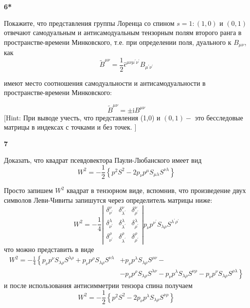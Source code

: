 \documentclass[a4paper,12pt]{article} %
\begin{document}
\begin{task}\textbf{6*}

Покажите, что представления группы Лоренца со спином $s = 1:
(1, 0)$ и $(0, 1)$ отвечают самодуальным и антисамодуальным 
тензорным полям второго ранга в пространстве-времени Минковского, т.е. при
определении поля, дуального к $ B_{\mu\nu}$, как
$$
\tilde{B}^{\mu \nu}=\frac{1}{2} \hat{\epsilon}^{\mu \nu \mu^{\prime} \nu^{\prime}} B_{\mu^{\prime} \nu^{\prime}}
$$

имеют место соотношения самодуальности и антисамодуальности в
пространстве-времени Минковского:

$$
\tilde{B}^{\mu \nu}=\pm \mathrm{i} B^{\mu \nu}
$$
[Hint: При выводе учесть, что представления (1,0) и $(0,1)-$ это бесследовые матрицы в индексах с точками и без точек. $]$







\end{task}


\begin{task}\textbf{7}

Доказать, что квадрат псевдовектора Паули-Любанского имеет вид
$$
W^{2}=-\frac{1}{2}\left\{p^{2} S^{2}-2 p_{\nu} p^{\mu} S_{\mu \lambda} S^{\nu \lambda}\right\}
$$


Просто запишем $W^{2}$ квадрат в тензорном виде, 
вспомнив, что произведение двух символов Леви-Чивиты запишутся через определитель матрицы ниже:
$$
W^{2}=-\frac{1}{4}\left|\begin{array}{ccc}
	\delta_{\nu^{\prime}}^{\nu} & \delta_{\lambda^{\prime}}^{\nu} & \delta_{\rho^{\prime}}^{\nu} \\
	\delta_{\nu^{\prime}}^{\lambda} & \delta_{\lambda^{\prime}}^{\lambda} & \delta_{\rho^{\prime}}^{\lambda} \\
	\delta_{\nu^{\prime}}^{\rho} & \delta_{\lambda^{\prime}}^{\rho} & \delta_{\rho^{\prime}}^{\rho}
\end{array}\right| 
p_{\nu} p^{\nu^{\prime}} S_{\lambda \rho} S^{\lambda^{\prime} \rho^{\prime}}
$$
что можно представить в виде
$$
\begin{aligned}
	W^{2}=-\frac{1}{4}\left\{p_{\nu} p^{\nu} S_{\lambda \rho} S^{\lambda \rho}+p_{\nu} p^{\rho} S_{\lambda \rho} S^{\nu \lambda}\right.&+p_{\nu} p^{\lambda} S_{\lambda \rho} S^{\rho \nu}-\\
	&\left.-p_{\nu} p^{\rho} S_{\lambda \rho} S^{\lambda \nu}-p_{\nu} p^{\lambda} S_{\lambda \rho} S^{\nu \rho}-p_{\nu} p^{\nu} S_{\lambda \rho} S^{\rho \lambda}\right\}
\end{aligned}
$$
и после использования антисимметрии тензора спина получаем
$$
W^{2}=-\frac{1}{2}\left\{p^{2} S^{2}-2 p_{\nu} p^{\lambda} S_{\lambda \rho} S^{\nu \rho}\right\}
$$






\end{task}
\end{document}
